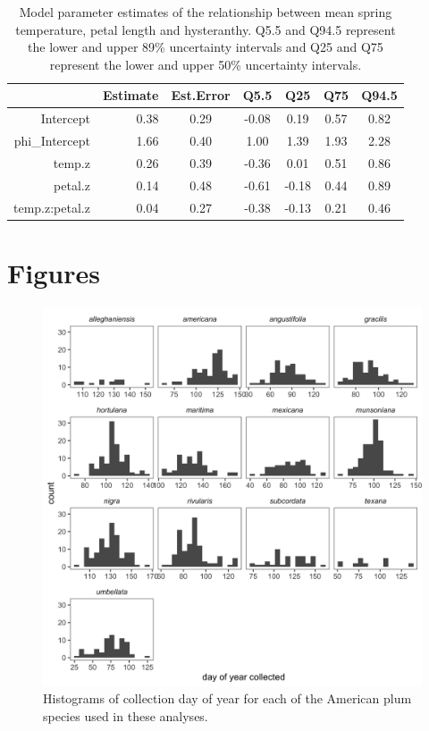 \documentclass{article}[11pt]
\begin{document}
\begin{table}[ht]
\centering
\begin{tabular}{|rrccccc|}
  \hline
 & Estimate & Est.Error & Q5.5 & Q25 & Q75 & Q94.5 \\ 
  \hline
Intercept & 0.38 & 0.29 & -0.08 & 0.19 & 0.57 & 0.82 \\ 
  phi\_Intercept & 1.66 & 0.40 & 1.00 & 1.39 & 1.93 & 2.28 \\ 
  temp.z & 0.26 & 0.39 & -0.36 & 0.01 & 0.51 & 0.86 \\ 
  petal.z & 0.14 & 0.48 & -0.61 & -0.18 & 0.44 & 0.89 \\ 
  temp.z:petal.z & 0.04 & 0.27 & -0.38 & -0.13 & 0.21 & 0.46 \\ 
   \hline
\end{tabular}
\caption{Model parameter estimates of the relationship between mean spring temperature, petal length and hysteranthy. Q5.5 and Q94.5 represent the lower and upper 89\% uncertainty intervals and Q25 and Q75 represent the lower and upper 50\% uncertainty intervals.} 
\label{tab:temp}
\end{table}

\clearpage

\section*{Figures}
\begin{figure}[ht]
    \centering
 \includegraphics[width=.6\textwidth]{..//..//Plots/whatReviwerswant/seasonal_distrbn.jpeg}
   
     \caption{Histograms of collection day of year for each of the American plum species used in these analyses.}
      \label{fig:bias}
\end{figure}
\end{document}

